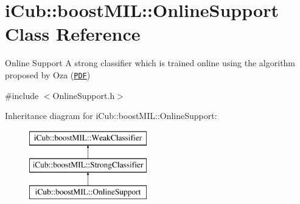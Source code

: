 \section{i\+Cub\+:\+:boost\+M\+I\+L\+:\+:Online\+Support Class Reference}
\label{classiCub_1_1boostMIL_1_1OnlineSupport}


Online Support A strong classifier which is trained online using the algorithm proposed by Oza (\href{http://ti.arc.nasa.gov/m/profile/oza/b2hd-oza05.html}{\tt P\+D\+F})  




{\ttfamily \#include $<$Online\+Support.\+h$>$}

Inheritance diagram for i\+Cub\+:\+:boost\+M\+I\+L\+:\+:Online\+Support\+:\begin{figure}[H]
\begin{center}
\leavevmode
\includegraphics[height=3.000000cm]{classiCub_1_1boostMIL_1_1OnlineSupport}
\end{center}
\end{figure}
